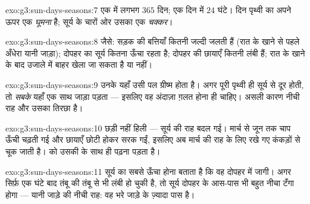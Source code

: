 \begin{solution}{exo:g3:sun-days-seasons:7}
एक  में लगभग $365$ दिन; एक दिन में $24$ घंटे। दिन पृथ्वी का
अपने ऊपर एक \emph{घूमना} है;  सूर्य के चारों ओर उसका एक
\emph{चक्कर}।
\end{solution}

\begin{solution}{exo:g3:sun-days-seasons:8}
जैसे: सड़क की बत्तियाँ कितनी जल्दी जलती हैं (रात के खाने से पहले
अँधेरा यानी जाड़ा); दोपहर का सूर्य कितना ऊँचा रहता है; दोपहर की
छायाएँ कितनी लंबी हैं; रात के खाने के बाद उजाले में बाहर खेला जा सकता
है या नहीं।
\end{solution}

\begin{solution}{exo:g3:sun-days-seasons:9}
उनके यहाँ उसी पल ग्रीष्म होता है। अगर पूरी पृथ्वी ही सूर्य से दूर
होती, तो \emph{सबके} यहाँ एक साथ जाड़ा पड़ता --- इसलिए वह अंदाज़ा
ग़लत होना ही चाहिए। असली कारण नीची राह और उसका तिरछा  है।
\end{solution}

\begin{solution}{exo:g3:sun-days-seasons:10}
छड़ी नहीं हिली --- सूर्य की राह बदल गई। मार्च से जून तक चाप ऊँची
चढ़ती गई और छायाएँ छोटी होकर सरक गईं, इसलिए अब  मार्च की राह के
लिए रखे गए कंकड़ों से चूक जाती है।  को उसकी  के साथ ही पढ़ना
पड़ता है।
\end{solution}

\begin{solution}{exo:g3:sun-days-seasons:11}
सूर्य का सबसे ऊँचा होना बताता है कि वह दोपहर में जागी। अगर सिर्फ़ एक
घंटे बाद तंबू की  तंबू से भी लंबी हो चुकी है, तो सूर्य दोपहर के
आस-पास भी बहुत नीचा टँगा होगा --- यानी जाड़े की नीची राह: वह भरे जाड़े
के ज़्यादा पास है।
\end{solution}

